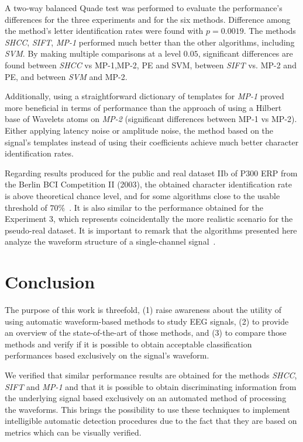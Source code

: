 \documentclass[brainsci,article,submit,moreauthors,pdftex,10pt,a4paper]{mdpi}
\begin{document}
A two-way balanced Quade test was performed to evaluate the performance's differences for the three experiments and for the six methods.  Difference among the method's letter identification rates were found with $p=0.0019$.  The methods \textit{SHCC}, \textit{SIFT}, \textit{MP-1} performed much better than the other algorithms, including \textit{SVM}.  By making multiple comparisons at a level  $0.05$, significant differences are found between \textit{SHCC} vs MP-1,MP-2, PE and SVM, between \textit{SIFT} vs. MP-2 and PE, and between \textit{SVM} and MP-2.

Additionally, using a straightforward dictionary of templates for \textit{MP-1} proved more beneficial in terms of performance than the approach of using a Hilbert base of Wavelets atoms on \textit{MP-2} (significant differences between MP-1 vs MP-2).  Either applying latency noise or amplitude noise, the method based on the signal's templates instead of using their coefficients achieve much better character identification rates.  

Regarding results produced for the public and real dataset IIb of P300 ERP from the Berlin BCI Competition II (2003), the obtained character identification rate is above theoretical chance level, and for some algorithms close to the usable threshold of $70\%$~\citep{Kathner2017}.  It is also similar to the performance obtained for the Experiment 3, which represents coincidentally the more realistic scenario for the pseudo-real dataset.  It is important to remark that the algorithms presented here analyze the waveform structure of a single-channel signal~\citep{Gribonval2008}.  

\section{Conclusion}
\label{section:conclusion}

The purpose of this work is threefold, (1) raise awareness about the utility of using automatic waveform-based methods to study EEG signals, (2) to provide an overview of the state-of-the-art of those methods, and (3) to compare those methods and verify if it is possible to obtain acceptable classification performances based exclusively on the signal's waveform.

We verified that similar performance results are obtained for the methods \textit{SHCC}, \textit{SIFT} and \textit{MP-1} and that it is possible to obtain discriminating information from the underlying signal based exclusively on an automated method of processing the waveforms.  This brings the possibility to use these techniques to implement intelligible automatic detection procedures due to the fact that they are based on metrics which can be visually verified.  
\end{document}
